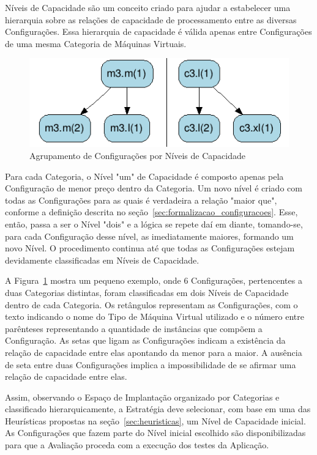 Níveis de Capacidade são um conceito criado para ajudar a estabelecer uma hierarquia 
sobre as relações de capacidade de processamento entre as diversas Configurações. 
Essa hierarquia de capacidade é válida apenas entre Configurações de uma mesma 
Categoria de Máquinas Virtuais. 

\begin{figure}[hbt]
  \caption{\label{fig_niveis_capacidade}Agrupamento de Configurações por Níveis de Capacidade}
  \begin{center}
    \includegraphics{img/exemplo-niveis-capacidade}
  \end{center}
\end{figure}

Para cada Categoria, o Nível "um" de Capacidade é composto apenas pela Configuração 
de menor preço dentro da Categoria. Um novo nível é criado com todas as Configurações 
para as quais é verdadeira a relação "maior que", conforme a definição descrita 
no seção~\ref{sec:formalizacao_configuracoes}. Esse, então, passa a ser o Nível 
"dois" e a lógica se repete daí em diante, tomando-se, para cada Configuração 
desse nível, as imediatamente maiores, formando um novo Nível. O procedimento 
continua até que todas as Configurações estejam devidamente classificadas em 
Níveis de Capacidade.

A Figura~\ref{fig_niveis_capacidade} mostra um pequeno exemplo, onde 6 Configurações,
pertencentes a duas Categorias distintas, foram classificadas em dois Níveis de 
Capacidade dentro de cada Categoria. Os retângulos representam as Configurações, 
com o texto indicando o nome do Tipo de Máquina Virtual utilizado e o número entre 
parênteses representando a quantidade de instâncias que compõem a Configuração. 
As setas que ligam as Configurações indicam a existência da relação de capacidade 
entre elas apontando da menor para a maior. A ausência de seta entre duas Configurações 
implica a impossibilidade de se afirmar uma relação de capacidade entre elas. 

Assim, observando o Espaço de Implantação organizado por Categorias e classificado
hierarquicamente, a Estratégia deve selecionar, com base em uma das Heurísticas 
propostas na seção~\ref{sec:heuristicas}, um Nível de Capacidade inicial. As 
Configurações que fazem parte do Nível inicial escolhido são disponibilizadas 
para que a Avaliação proceda com a execução dos testes da Aplicação.

